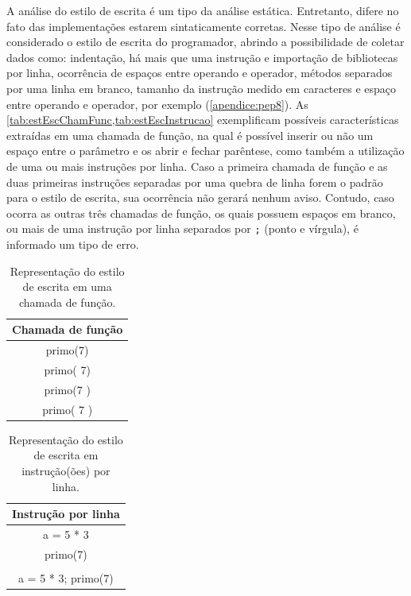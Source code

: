 			A análise do estilo de escrita é um tipo da análise estática. Entretanto,
			difere no fato das implementações estarem sintaticamente corretas. Nesse
			tipo de análise é considerado o estilo de escrita do programador, abrindo a
			possibilidade de coletar dados como: indentação, há mais que uma instrução e importação
			de bibliotecas por linha, ocorrência de espaços entre operando e operador,
			métodos separados por uma linha em branco, tamanho da instrução  medido em
			caracteres e espaço entre operando e operador, por exemplo (\cref{apendice:pep8}).
			As \cref{tab:estEscChamFunc,tab:estEscInstrucao} exemplificam possíveis características
			extraídas em uma chamada de função, na qual é possível inserir ou não um
			espaço entre o parâmetro e os  abrir e fechar parêntese,
			como também a utilização de uma ou mais instruções por linha. Caso a primeira
			chamada de função e as duas primeiras instruções separadas por uma quebra de linha
			forem o padrão para o estilo de escrita, sua ocorrência não gerará nenhum
			aviso. Contudo, caso ocorra as outras três chamadas de função, os quais
			possuem espaços em branco, ou mais de uma instrução por linha separados
			por \texttt{;} (ponto e vírgula), é informado um tipo de erro.
			
			\begin{table}
				\centering
				\begin{tabular}{|c|}
					\hline
					Chamada de função\\ \hline
					primo(7)\\
					primo( 7)\\
					primo(7 )\\
					primo( 7 )\\
					\hline
				\end{tabular}
				\caption[Representação do estilo de escrita]{Representação do estilo
				de escrita em uma chamada de função.}
				\label{tab:estEscChamFunc}
			\end{table}
			
			\begin{table}
				\centering
				\begin{tabular}{|c|}
					\hline
					Instrução por linha \\ \hline
					a = 5 * 3  \\
					primo(7)	 \\
					\\
					a = 5 * 3; primo(7)	\\
					\hline
				\end{tabular}
				\caption{Representação do estilo de escrita em instrução(ões) por linha.}
				\label{tab:estEscInstrucao}
			\end{table}
			
